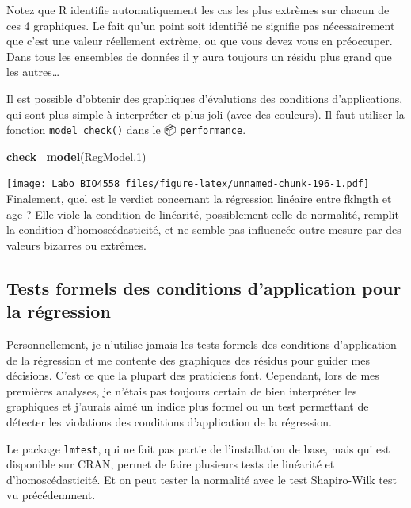 \documentclass[
  12pt,
]{book}
\makeatletter
\newenvironment{Shaded}{\begin{snugshade}}{\end{snugshade}}
\newcommand{\FloatTok}[1]{\textcolor[rgb]{0.00,0.00,0.81}{#1}}
\newcommand{\KeywordTok}[1]{\textcolor[rgb]{0.13,0.29,0.53}{\textbf{#1}}}
\newcommand{\NormalTok}[1]{#1}
\newenvironment{kframe}{%
\medskip{}
\setlength{\fboxsep}{.8em}
\def\at@end@of@kframe{}%
\ifinner\ifhmode%
 \def\at@end@of@kframe{\end{minipage}}%
 \begin{minipage}{\columnwidth}%
\fi\fi%
\def\FrameCommand##1{\hskip\@totalleftmargin \hskip-\fboxsep
\colorbox{incolor}{##1}\hskip-\fboxsep
    \hskip-\linewidth \hskip-\@totalleftmargin \hskip\columnwidth}%
\MakeFramed {\advance\hsize-\width
  \@totalleftmargin\z@ \linewidth\hsize
  \@setminipage}}%
{\par\unskip\endMakeFramed%
\at@end@of@kframe}
\newenvironment{rmdblock}[1]
 {
 \begin{itemize}
 \renewcommand{\labelitemi}{
   \raisebox{-.7\height}[0pt][0pt]{
     {\setkeys{Gin}{width=3em,keepaspectratio}\texttt{[image: images/\#1]}}
   }
 }
 \begin{kframe}
 \setlength{\fboxsep}{1em}
 \item
 }
 {
 \end{kframe}
 \end{itemize}
 }
\newenvironment{rmdwarning}
  {\begin{rmdblock}{warning}}
  {\end{rmdblock}}
\makeatother
\begin{document}
\begin{rmdwarning}
Notez que R identifie automatiquement les cas les plus extrèmes sur chacun de ces 4 graphiques. Le fait qu'un point soit identifié ne signifie pas nécessairement que c'est une valeur réellement extrème, ou que vous devez vous en préoccuper. Dans tous les ensembles de données il y aura toujours un résidu plus grand que les autres\ldots{}
\end{rmdwarning}

Il est possible d'obtenir des graphiques d'évalutions des conditions d'applications, qui sont plus simple à interpréter et plus joli (avec des couleurs).
Il faut utiliser la fonction \texttt{model\_check()} dans le 📦 \texttt{performance}.

\begin{Shaded}
\begin{Highlighting}[]
\KeywordTok{check\_model}\NormalTok{(RegModel}\FloatTok{.1}\NormalTok{)}
\end{Highlighting}
\end{Shaded}

\texttt{[image: Labo\_BIO4558\_files/figure-latex/unnamed-chunk-196-1.pdf]}
Finalement, quel est le verdict concernant la régression linéaire entre fklngth et age ? Elle viole la condition de linéarité, possiblement celle de normalité, remplit la condition d'homoscédasticité, et ne semble pas influencée outre mesure par des valeurs bizarres ou extrêmes.

\hypertarget{tests-formels-des-conditions-dapplication-pour-la-ruxe9gression}{%
\subsection{Tests formels des conditions d'application pour la régression}\label{tests-formels-des-conditions-dapplication-pour-la-ruxe9gression}}

Personnellement, je n'utilise jamais les tests formels des conditions d'application de la régression et me contente des graphiques des résidus pour guider mes décisions. C'est ce que la plupart des praticiens font. Cependant, lors de mes premières analyses, je n'étais pas toujours certain de bien interpréter les graphiques et j'aurais aimé un indice plus formel ou un test permettant de détecter les violations des conditions d'application de la régression.

Le package \texttt{lmtest}, qui ne fait pas partie de l'installation de base, mais qui est disponible sur CRAN, permet de faire plusieurs tests de linéarité et d'homoscédasticité. Et on peut tester la normalité avec le test Shapiro-Wilk test vu précédemment.
\end{document}
